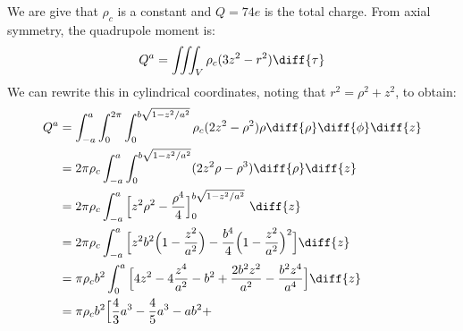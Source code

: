 \documentclass[crop=false,class=book,oneside]{standalone}
\begin{document}
            \begin{solution}
                We are give that $\rho_{c}$ is a constant and
                $Q=74e$ is the total charge. From axial symmetry, the
                quadrupole moment is:
                \begin{equation}
                    Q^{a}=\iiint_{V}\rho_{c}(3z^{2}-r^{2})\diff{\tau}
                \end{equation}
                We can rewrite this in cylindrical coordinates, noting
                that $r^{2}=\rho^{2}+z^{2}$, to obtain:
                \begin{subequations}
                    \begin{align}
                        Q^{a}&=\int_{-a}^{a}\int_{0}^{2\pi}
                            \int_{0}^{b\sqrt{1-z^{2}/a^{2}}}
                                \rho_{c}(2z^{2}-\rho^{2})\rho
                                \diff{\rho}\diff{\phi}\diff{z}\\
                            &=2\pi\rho_{c}\int_{-a}^{a}
                                \int_{0}^{b\sqrt{1-z^{2}/a^{2}}}
                                (2z^{2}\rho-\rho^{3})
                                \diff{\rho}\diff{z}\\
                            &=2\pi\rho_{c}\int_{-a}^{a}
                                \Big[z^{2}\rho^{2}-
                                     \frac{\rho^{4}}{4}
                                \Big]_{0}^{b\sqrt{1-z^{2}/a^{2}}}\
                                \diff{z}\\
                            &=2\pi\rho_{c}\int_{-a}^{a}
                                \Big[z^{2}b^{2}
                                    \Big(1-\frac{z^{2}}{a^{2}}\Big)
                                     -\frac{b^{4}}{4}
                                     \Big(1-\frac{z^{2}}{a^{2}}\Big)^{2}
                                     \Big]\diff{z}\\
                            &=\pi\rho_{c}b^{2}\int_{0}^{a}
                                \Big[4z^{2}-
                                     4\frac{z^{4}}{a^{2}}-
                                     b^{2}+
                                     \frac{2b^{2}z^{2}}{a^{2}}-
                                     \frac{b^{2}z^{4}}{a^{4}}
                                \Big]\diff{z}\\
                            &=\pi\rho_{c}b^{2}
                                \Big[\frac{4}{3}a^{3}-
                                     \frac{4}{5}a^{3}-
                                     ab^{2}+

\end{align}
\end{subequations}
\end{solution}
\end{document}
